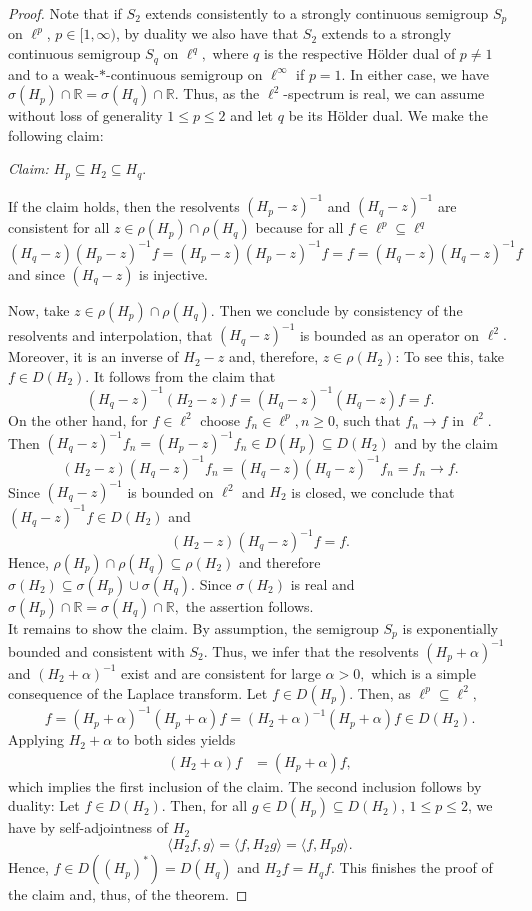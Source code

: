 \documentclass[10pt]{amsart}
\theoremstyle{definition}
\begin{document}
\begin{proof}
Note that if $S_2$ extends consistently to a strongly continuous semigroup $S_p$ on $\ell^p$, $p\in[1,\infty)$,  by duality we also have that $S_2$ extends to a strongly continuous semigroup $S_q$ on $\ell^q,$ where $q$ is the respective H\"older dual of $p\neq 1$ and to a weak-$\ast$-continuous semigroup on $\ell^\infty$ if $p=1$. In either case, we have $  \sigma( H_p)\cap\mathbb{R} = \sigma( H_q)\cap\mathbb{R}.$ Thus, as the $\ell^2$-spectrum is real, we can assume without loss of generality $1\leq p\leq 2$ and let $q$ be its Hölder dual.  We make  the following claim:\medskip

    \emph{Claim:} $ H_p\subseteq H_2\subseteq H_q.$\medskip
    
If the claim holds, then the resolvents $( H_p-z)^{-1}$ and $( H_q-z)^{-1}$ are consistent for all $z\in \rho( H_p)\cap\rho( H_q)$ because for all $f\in\ell^p\subseteq \ell^q$
\[( H_q-z)( H_p-z)^{-1}f = ( H_p-z)( H_p-z)^{-1}f = f= ( H_q-z)( H_q-z)^{-1}f \]
and since $( H_{q}-z)$ is injective.


Now, take $z\in\rho( H_p)\cap{\rho( H_q)}.$ Then we conclude by consistency of the resolvents and interpolation, that $( H_q-z)^{-1}$ is bounded as an operator on $\ell^2.$ Moreover, it is an inverse of $ H_2-z$ and, therefore, $z\in\rho( H_2)$: To see this, take $f\in D( H_2).$ It follows from the claim that 
\[( H_q-z)^{-1}( H_2-z)f = ( H_q-z)^{-1}( H_q-z)f = f.\]
On the other hand, for $f\in\ell^2$ choose $f_n\in\ell^p,n\geq 0$, such that $f_n\rightarrow f$ in $\ell^2.$ Then $( H_q-z)^{-1}f_n = ( H_p-z)^{-1}f_n\in D( H_p)\subseteq D( H_2)$ and by the claim
\[( H_2-z)( H_q-z)^{-1}f_n = ( H_q-z)( H_q-z)^{-1}f_n = f_n\rightarrow f.\] Since $( H_q-z)^{-1}$ is bounded on $\ell^2$ and $ H_2$ is closed, we conclude that $(H_q-z)^{-1}f\in D(H_2)$ and
\[( H_2-z)( H_q-z)^{-1}f = f.\]
Hence, $\rho(H_p)\cap\rho(H_q)\subseteq\rho(H_2)$ and therefore $\sigma(H_2)\subseteq \sigma(H_p)\cup\sigma(H_q).$ Since $\sigma(H_2)$ is real and $\sigma(H_p) \cap\mathbb{R}= \sigma(H_q)\cap\mathbb{R},$ the assertion follows.\\
It remains to show the claim. By assumption, the semigroup $S_p $ is exponentially bounded and consistent with $S_2$. Thus, we infer that the resolvents $( H_p+\alpha)^{-1}$ and $( H_2+\alpha)^{-1}$ exist and are consistent for large $\alpha>0,$ which is a simple consequence of the Laplace transform. Let $f\in D( H_p).$ Then, as $\ell^p\subseteq \ell^2,$
\[f = ( H_p+\alpha)^{-1}( H_p+\alpha)f = ( H_2+\alpha)^{-1}( H_p+\alpha)f\in D( H_2).\]
Applying $ H_2+\alpha$ to both sides yields
\begin{align*}
    ( H_2+\alpha) f &=   ( H_p+\alpha)f,
\end{align*}
which implies the first inclusion of the claim. The second inclusion follows  by duality: Let $f\in D( H_2).$ Then, for all $g\in D( H_p)\subseteq D( H_2)$, $1\leq p\leq 2$, we have by self-adjointness of $ H_2$
\[\langle   H_2 f, g\rangle = \langle f,  H_2 g\rangle = \langle  f,  H_p g\rangle.\]
Hence, $f\in D(( H_p)^*) = D( H_q)$ and $ H_2 f =  H_q f.$ This finishes the proof of the claim and, thus, of the theorem.
\end{proof} 
\end{document}
